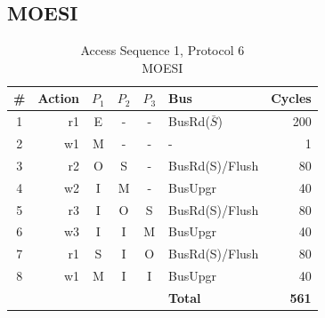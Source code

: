 \documentclass[12pt, letterpaper]{report}
\begin{document}
\subsection{MOESI}

\begin{table}[H]
	\setlength{\extrarowheight}{.5ex}
	\centering
	\begin{tabular}{ |c|r|c|c|c|l|r| }
		\hline
		\textbf{\#} & \textbf{Action} & \textbf{$P_1$} & \textbf{$P_{2}$} & \textbf{$P_3$} & \textbf{Bus} & \textbf{Cycles} \\
		\hline
		1 & r1 & E & - & - & BusRd($\bar{S}$) & 200 \\
		\hline
		2 & w1 & M & - & - & - & 1 \\
		\hline
		3 & r2 & O & S & - & BusRd(S)/Flush & 80 \\
		\hline
		4 & w2 & I & M & - & BusUpgr & 40 \\
		\hline
		5 & r3 & I & O & S & BusRd(S)/Flush & 80 \\
		\hline
		6 & w3 & I & I & M & BusUpgr & 40 \\
		\hline
		7 & r1 & S & I & O & BusRd(S)/Flush & 80 \\
		\hline
		8 & w1 & M & I & I & BusUpgr & 40 \\
		\hline \hline \hline
		\cellcolor{null} & \cellcolor{null} & \cellcolor{null} & \cellcolor{null} & \cellcolor{null} & \textbf{Total} & \textbf{561} \\
		\hline
	\end{tabular}
	\caption{Access Sequence 1, Protocol 6\\MOESI}
\end{table}
\end{document}
